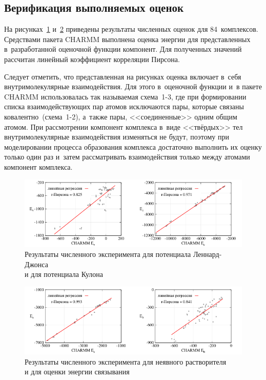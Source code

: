 \subsection{Верификация выполняемых оценок}


На рисунках~\ref{first} и~\ref{second} приведены результаты численных оценок для 84~комплексов. Средствами пакета CHARMM выполнена оценка энергии для представленных в~разработанной оценочной функции компонент. Для полученных значений рассчитан линейный коэффициент корреляции Пирсона.

Следует отметить, что представленная на рисунках оценка включает в~себя внутримолекулярные взаимодействия. Для этого в~оценочной функции и~в пакете CHARMM использовалась так называемая схема~1-3, где при формировании списка взаимодействующих пар атомов исключаются пары, которые связаны ковалентно~(схема~1-2), а~также пары, <<соединенные>> одним общим атомом. При рассмотрении компонент комплекса в~виде <<твёрдых>> тел внутримолекулярные взаимодействия изменяться не будут, поэтому при моделировании процесса образования комплекса достаточно выполнить их оценку только один раз и~затем рассматривать взаимодействия только между атомами компонент комплекса.

\begin{figure}[h!]
	\captionsetup{justification=centering}
	\centering
	\includegraphics[width=1.0\linewidth]{images/first.pdf}
	\caption{Результаты численного эксперимента для потенциала Леннард-Джонса \\ и для потенциала Кулона}
	\label{first}
\end{figure}

\begin{figure}[h!]
	\captionsetup{justification=centering}
	\centering
	\includegraphics[width=1.0\linewidth]{images/second.pdf}
	\caption{Результаты численного эксперимента для неявного растворителя \\ и для оценки энергии связывания}
	\label{second}
\end{figure}

